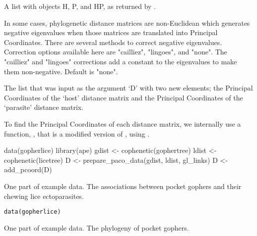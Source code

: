 \documentclass[letterpaper]{book}
\begin{document}
\begin{Arguments}
\begin{ldescription}
\item[\code{D}] A list with objects H, P, and HP, as returned by .

\item[\code{correction}] In some cases, phylogenetic distance matrices are non-Euclidean which generates negative eigenvalues when those matrices are translated into Principal Coordinates. There are several methods to correct negative eigenvalues. Correction options available here are "cailliez", "lingoes", and "none". The "cailliez" and "lingoes" corrections add a constant to the eigenvalues to make them non-negative. Default is "none".
\end{ldescription}
\end{Arguments}
%
\begin{Value}
The list that was input as the argument `D' with two new elements; the Principal Coordinates of the `host' distance matrix and the Principal Coordinates of the `parasite' distance matrix.
\end{Value}
%
\begin{Note}\relax
To find the Principal Coordinates of each distance matrix, we internally use a function, , that is a modified version of , using .
\end{Note}
%
\begin{Examples}
\begin{ExampleCode}
data(gopherlice)
library(ape)
gdist <- cophenetic(gophertree)
ldist <- cophenetic(licetree)
D <- prepare_paco_data(gdist, ldist, gl_links)
D <- add_pcoord(D)
\end{ExampleCode}
\end{Examples}
%
\begin{Description}\relax
One part of example data. The associations between pocket gophers and their chewing lice ectoparasites.
\end{Description}
%
\begin{Usage}
\begin{verbatim}
data(gopherlice)
\end{verbatim}
\end{Usage}
%
\begin{Description}\relax
One part of example data. The phylogeny of pocket gophers.
\end{Description}
\end{document}
